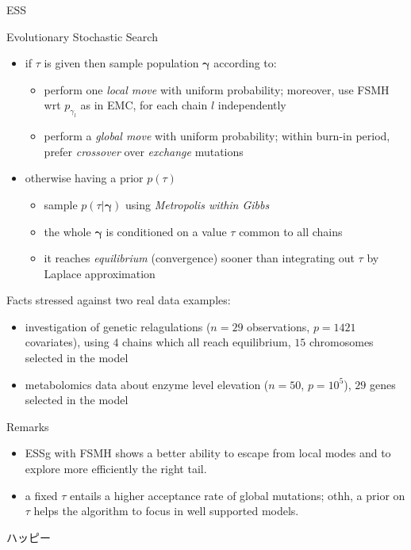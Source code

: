 \documentclass{beamer}
\newcommand{\vect}[1]{\boldsymbol{#1}}
\begin{document}
\begin{frame}{ESS}
\begin{block}{Evolutionary Stochastic Search}
    \begin{itemize}
        \item if $\tau$ is given then sample population $\vect{\gamma}$ according to: 
            \begin{itemize}
                \item perform one \emph{local move} with uniform probability; moreover, 
                    use FSMH wrt $p_{\gamma_{l}}$ as in EMC, for each chain $l$ independently
                \item perform a \emph{global move} with uniform probability; within burn-in period, prefer
                    \emph{crossover} over \emph{exchange} mutations 
            \end{itemize}
        \item otherwise having a prior $p(\tau)$ 
            \begin{itemize}
                \item sample $p(\tau|\vect{\gamma})$ using \emph{Metropolis within Gibbs}
                \item the whole $\vect{\gamma}$ is conditioned on a value $\tau$ common to all chains
                \item it reaches \emph{equilibrium} (convergence) sooner than integrating out $\tau$ by Laplace approximation
            \end{itemize}
    \end{itemize}
\end{block}
\end{frame}

\begin{frame}{Facts}
stressed against two real data examples:
\begin{itemize}
    \item investigation of genetic relagulations ($n=29$ observations, $p=1421$
    covariates), using $4$ chains which all reach equilibrium, $15$ chromosomes
    selected in the model
    \item metabolomics data about enzyme level elevation ($n=50$, $p=10^{5}$), $29$
    genes selected in the model
\end{itemize}
\vfill
\begin{block}{Remarks}
\begin{itemize}
    \item ESSg with FSMH shows a better ability to escape from local modes and
    to explore more efficiently the right tail.
    \item a fixed $\tau$ entails a higher acceptance rate of global mutations;
    othh, a prior on $\tau$ helps the algorithm to focus in well supported models.
\end{itemize}
\end{block}
\end{frame}

\begin{frame}{ }
\Huge
\begin{CJK}{UTF8}{min}
ハッピー
\end{CJK}
\end{frame}
\end{document}
